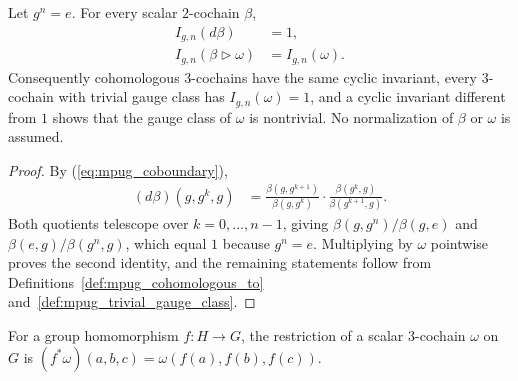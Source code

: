\begin{lemma}
    \label{thm:mpug_cyclic_invariant_gauge}
    \leanok
    Let $g^n=e$. For every scalar $2$-cochain $\beta$,
    \begin{align}
        I_{g,n}(d\beta)                              & =1,               \\
        I_{g,n}(\beta\mathbin{\triangleright}\omega) & =I_{g,n}(\omega).
    \end{align}
    Consequently cohomologous $3$-cochains have the same cyclic invariant,
    every $3$-cochain with trivial gauge class has $I_{g,n}(\omega)=1$, and a
    cyclic invariant different from $1$ shows that the gauge class of
    $\omega$ is nontrivial. No normalization of $\beta$ or $\omega$ is
    assumed.
\end{lemma}
\begin{proof}\leanok
    By (\ref{eq:mpug_coboundary}),
    \begin{align}
        (d\beta)(g,g^k,g)
         & =\frac{\beta(g,g^{k+1})}{\beta(g,g^k)}\cdot
        \frac{\beta(g^k,g)}{\beta(g^{k+1},g)}.
    \end{align}
    Both quotients telescope over $k=0,\dots,n-1$, giving
    $\beta(g,g^n)/\beta(g,e)$ and $\beta(e,g)/\beta(g^n,g)$, which equal $1$
    because $g^n=e$. Multiplying by $\omega$ pointwise proves the second
    identity, and the remaining statements follow from
    Definitions~\ref{def:mpug_cohomologous_to}
    and~\ref{def:mpug_trivial_gauge_class}.
\end{proof}

\begin{definition}
    \label{def:mpug_cochain_restriction}
    \leanok
    For a group homomorphism $f\colon H\to G$, the restriction of a scalar
    $3$-cochain $\omega$ on $G$ is
    $(f^*\omega)(a,b,c)=\omega(f(a),f(b),f(c))$.
\end{definition}

